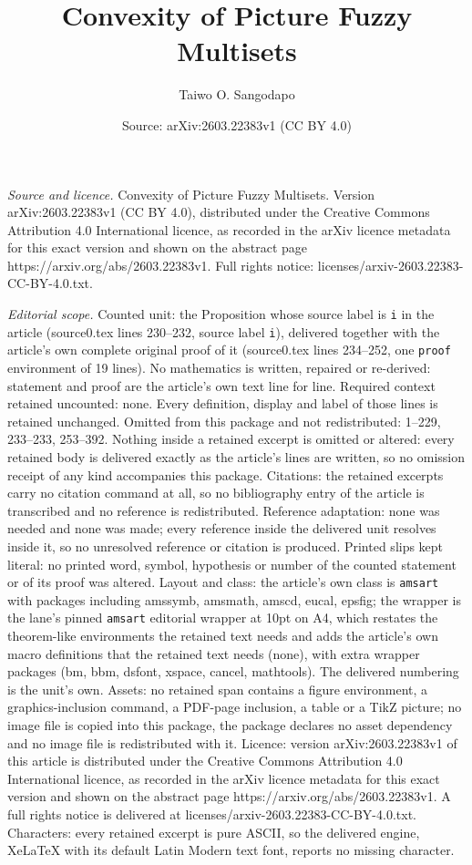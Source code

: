 \documentclass[10pt,a4paper]{amsart}
\title[Convexity of Picture Fuzzy Multisets]{Convexity of Picture Fuzzy Multisets}
\author{Taiwo O. Sangodapo}
\date{Source: arXiv:2603.22383v1 (CC BY 4.0)}
\begin{document}
\maketitle

\noindent\emph{Source and licence.} Convexity of Picture Fuzzy Multisets. Version arXiv:2603.22383v1 (CC BY 4.0), distributed under the Creative Commons Attribution 4.0 International licence, as recorded in the arXiv licence metadata for this exact version and shown on the abstract page https://arxiv.org/abs/2603.22383v1. Full rights notice: licenses/arxiv-2603.22383-CC-BY-4.0.txt.\par\smallskip

\noindent\textit{Editorial scope.} Counted unit: the Proposition whose source label is \texttt{i} in the article (source0.tex lines 230--232, source label \texttt{i}), delivered together with the article's own complete original proof of it (source0.tex lines 234--252, one \texttt{proof} environment of 19 lines). No mathematics is written, repaired or re-derived: statement and proof are the article's own text line for line. Required context retained uncounted: none. Every definition, display and label of those lines is retained unchanged. Omitted from this package and not redistributed: 1--229, 233--233, 253--392. Nothing inside a retained excerpt is omitted or altered: every retained body is delivered exactly as the article's lines are written, so no omission receipt of any kind accompanies this package. Citations: the retained excerpts carry no citation command at all, so no bibliography entry of the article is transcribed and no reference is redistributed. Reference adaptation: none was needed and none was made; every reference inside the delivered unit resolves inside it, so no unresolved reference or citation is produced. Printed slips kept literal: no printed word, symbol, hypothesis or number of the counted statement or of its proof was altered. Layout and class: the article's own class is \texttt{amsart} with packages including amssymb, amsmath, amscd, eucal, epsfig; the wrapper is the lane's pinned \texttt{amsart} editorial wrapper at 10pt on A4, which restates the theorem-like environments the retained text needs and adds the article's own macro definitions that the retained text needs (none), with extra wrapper packages (bm, bbm, dsfont, xspace, cancel, mathtools). The delivered numbering is the unit's own. Assets: no retained span contains a figure environment, a graphics-inclusion command, a PDF-page inclusion, a table or a TikZ picture; no image file is copied into this package, the package declares no asset dependency and no image file is redistributed with it. Licence: version arXiv:2603.22383v1 of this article is distributed under the Creative Commons Attribution 4.0 International licence, as recorded in the arXiv licence metadata for this exact version and shown on the abstract page https://arxiv.org/abs/2603.22383v1. A full rights notice is delivered at licenses/arxiv-2603.22383-CC-BY-4.0.txt. Characters: every retained excerpt is pure ASCII, so the delivered engine, XeLaTeX with its default Latin Modern text font, reports no missing character.
\end{document}
